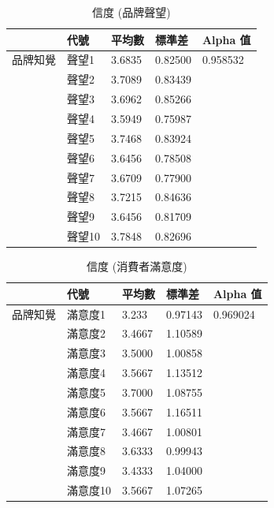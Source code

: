 \begin{table}[htb]
\caption{信度 (品牌聲望)}
\label{tab:e3}
\renewcommand{\arraystretch}{1.2} %
\arrayrulewidth=1pt               %
\tabcolsep=18pt                   %
\begin{tabular}[t]{lllll}  %
\hline
 & 代號& 平均數 & 標準差&  Alpha 值  \\
\hline
品牌知覺 & 聲望1  & 3.6835 &0.82500 &0.958532\\
              & 聲望2  & 3.7089 &0.83439 &  \\
             & 聲望3  &3.6962 &0.85266  &  \\
             & 聲望4  &3.5949&0.75987\\
             & 聲望5  & 3.7468 &0.83924 &  \\
             & 聲望6  & 3.6456&0.78508& \\
             & 聲望7  & 3.6709&0.77900  &  \\
             & 聲望8  & 3.7215&0.84636&  \\
             & 聲望9  &3.6456&0.81709&  \\
             & 聲望10  & 3.7848&0.82696 &  \\
\hline
\end{tabular}
\end{table}

\begin{table}[htb]
\caption{信度 (消費者滿意度)}
\label{tab:e4}
\renewcommand{\arraystretch}{1.2} %
\arrayrulewidth=1pt               %
\tabcolsep=18pt                   %
\begin{tabular}[t]{lllll}  %
\hline
 & 代號& 平均數 & 標準差&  Alpha 值  \\
\hline
品牌知覺 & 滿意度1&3.233&0.97143&0.969024\\
              & 滿意度2&3.4667&1.10589&  \\
             & 滿意度3&3.5000&1.00858&  \\
             & 滿意度4&3.5667&1.13512&\\
             & 滿意度5&3.7000&1.08755&  \\
             & 滿意度6&3.5667&1.16511&\\
             & 滿意度7&3.4667&1.00801&  \\
             & 滿意度8&3.6333&0.99943&  \\
             & 滿意度9&3.4333&1.04000&\\
             & 滿意度10&3.5667&1.07265&\\
\hline
\end{tabular}
\end{table}

